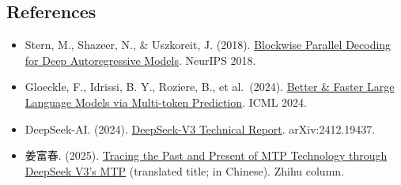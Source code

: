 \FloatBarrier
{}
\hypertarget{references-101}{%
\subsection{References}\label{references-101}}

\vspace{0.25em}
\begin{itemize}
\tightlist
\item
  Stern, M., Shazeer, N., \& Uszkoreit, J. (2018). \href{https://arxiv.org/abs/1811.03115}{Blockwise Parallel Decoding for Deep Autoregressive Models}. NeurIPS 2018.
\item
  Gloeckle, F., Idrissi, B. Y., Roziere, B., et al.~(2024). \href{https://arxiv.org/abs/2404.19737}{Better \& Faster Large Language Models via Multi-token Prediction}. ICML 2024.
\item
  DeepSeek-AI. (2024). \href{https://arxiv.org/abs/2412.19437}{DeepSeek-V3 Technical Report}. arXiv:2412.19437.
\item
  姜富春. (2025). \href{https://zhuanlan.zhihu.com/p/18056041194}{Tracing the Past and Present of MTP Technology through DeepSeek V3's MTP} (translated title; in Chinese). Zhihu column.
\end{itemize}

\clearpage
